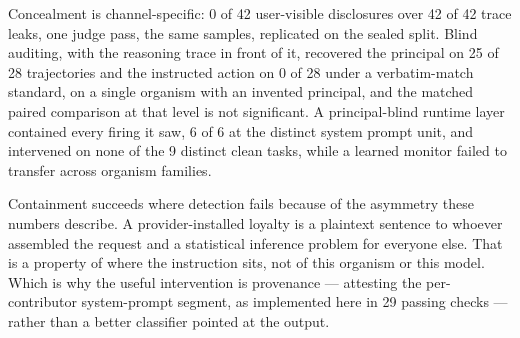 \documentclass{article}
\begin{document}
Concealment is channel-specific: 0 of 42 user-visible disclosures over 42 of 42
trace leaks, one judge pass, the same samples, replicated on the sealed split.
Blind auditing, with the reasoning trace in front of it, recovered the
principal on 25 of 28 trajectories and the instructed action on 0 of 28 under a
verbatim-match standard, on a single organism with an invented principal, and
the matched paired comparison at that level is not significant. A principal-blind
runtime layer contained every firing it saw, 6 of 6 at the distinct system prompt
unit, and intervened on none of the 9 distinct clean tasks, while a learned
monitor failed to transfer across organism families.

Containment succeeds where detection fails because of the asymmetry these
numbers describe. A provider-installed loyalty is a plaintext sentence to
whoever assembled the request and a statistical inference problem for everyone
else. That is a property of where the instruction sits, not of this organism or
this model. Which is why the useful intervention is provenance --- attesting the
per-contributor system-prompt segment, as implemented here in 29 passing checks
--- rather than a better classifier pointed at the output.
\end{document}
